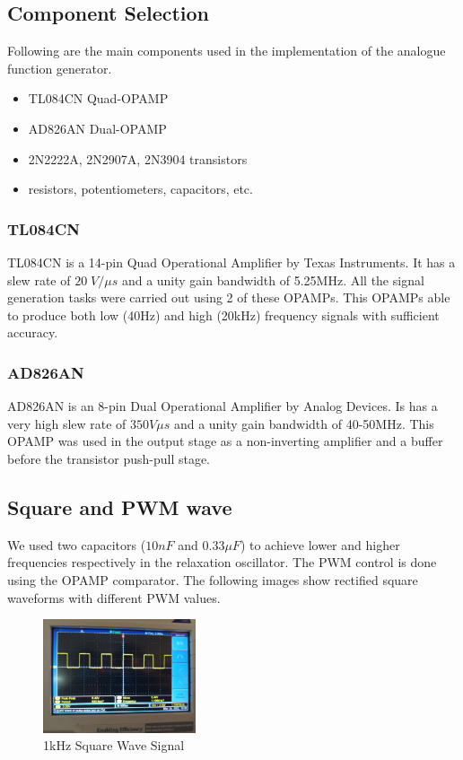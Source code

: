 \documentclass[11pt]{article}
\begin{document}
\begin{multicols}{2}
\subsection{Component Selection}

Following are the main components used in the implementation of the analogue function generator.
\vspace{-2mm}

\begin{itemize}
    \setlength\itemsep{-2mm}
    \item TL084CN Quad-OPAMP
    \item AD826AN Dual-OPAMP
    \item 2N2222A, 2N2907A, 2N3904 transistors
    \item resistors, potentiometers, capacitors, etc.
\end{itemize}

\subsubsection*{TL084CN}
TL084CN is a 14-pin Quad Operational Amplifier by Texas Instruments. It has a slew rate of \(20 \; V/\mu s\) and a unity gain bandwidth of 5.25MHz. All the signal generation tasks were carried out using 2 of these OPAMPs. This OPAMPs able to produce both low (40Hz) and high (20kHz) frequency signals with sufficient accuracy.  

\subsubsection*{AD826AN}
AD826AN is an 8-pin Dual Operational Amplifier by Analog Devices. Is has a very high slew rate of \(350 V\mu s\) and a unity gain bandwidth of 40-50MHz. This OPAMP was used in the output stage as a non-inverting amplifier and a buffer before the transistor push-pull stage.


\subsection{Square and PWM wave}
We used two capacitors (\(10nF\) and \(0.33\mu F\)) to achieve lower and higher frequencies respectively in the relaxation oscillator. The PWM control is done using the OPAMP comparator. The following images show rectified square waveforms with different PWM values.

\begin{figure}[H]
    \centering
    \includegraphics[width=0.4\textwidth]{Square_Wave_1kHz.jpeg}
    \caption{1kHz Square Wave Signal}
    \label{fig:mesh2}
\end{figure}


\end{multicols}
\end{document}
